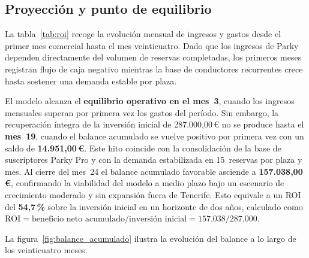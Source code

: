 \subsection{Proyección y punto de equilibrio}
\label{subsec:punto_equilibrio}

La tabla~\ref{tab:roi} recoge la evolución mensual de ingresos y gastos desde el primer mes comercial hasta el mes veinticuatro. Dado que los ingresos de Parky dependen directamente del volumen de reservas completadas, los primeros meses registran flujo de caja negativo mientras la base de conductores recurrentes crece hasta sostener una demanda estable por plaza.

El modelo alcanza el \textbf{equilibrio operativo en el mes~3}, cuando los ingresos mensuales superan por primera vez los gastos del período. Sin embargo, la recuperación íntegra de la inversión inicial de 287.000,00\,€ no se produce hasta el \textbf{mes~19}, cuando el balance acumulado se vuelve positivo por primera vez con un saldo de \textbf{14.951,00\,€}. Este hito coincide con la consolidación de la base de suscriptores Parky Pro y con la demanda estabilizada en 15~reservas por plaza y mes. Al cierre del mes~24 el balance acumulado favorable asciende a \textbf{157.038,00\,€}, confirmando la viabilidad del modelo a medio plazo bajo un escenario de crecimiento moderado y sin expansión fuera de Tenerife. Esto equivale a un ROI del \textbf{54,7\,\%} sobre la inversión inicial en un horizonte de dos años, calculado como $\text{ROI} = \text{beneficio neto acumulado} / \text{inversión inicial} = 157.038 / 287.000$.

La figura~\ref{fig:balance_acumulado} ilustra la evolución del balance a lo largo de los veinticuatro meses.

